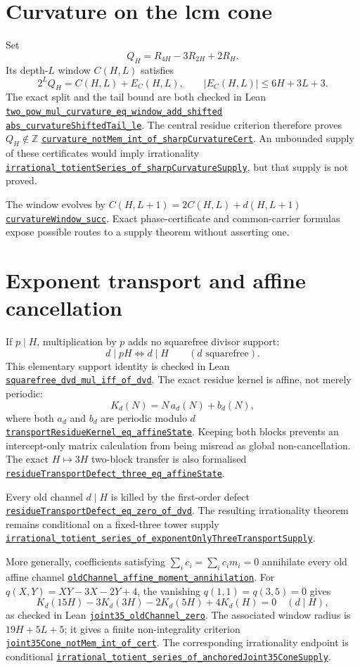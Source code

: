 \documentclass[11pt]{article}
\newcommand{\commit}{81150c1c6fdd4cd51e76d3aa0de344341e0e9e7c}
\newcommand{\repobase}{https://github.com/wcook04/plectis-lean-erdos249-257/blob/\commit}
\newcommand{\PK}{Erdos249257}
\newcommand{\lref}[3]{\href{\repobase/\PK/#1\#L#2}{\nolinkurl{#3}}}
\theoremstyle{remark}\newtheorem*{remark}{Remark}
\newcommand{\Z}{\mathbb Z}
\begin{document}
\section{Curvature on the lcm cone}\label{sec:curvature}
Set
\[
 Q_H=R_{4H}-3R_{2H}+2R_H.
\]
Its depth-$L$ window $C(H,L)$ satisfies
\[
 2^LQ_H=C(H,L)+E_C(H,L),\qquad |E_C(H,L)|\le6H+3L+3.
\]
The exact split and the tail bound are both checked in Lean
\lref{CurvatureCarry.lean}{119}{two_pow_mul_curvature_eq_window_add_shifted}
\lref{CurvatureCarry.lean}{137}{abs_curvatureShiftedTail_le}.
The central residue criterion therefore proves $Q_H\notin\Z$
\lref{CurvatureCarry.lean}{159}{curvature_notMem_int_of_sharpCurvatureCert}.
An unbounded supply of these certificates would imply irrationality
\lref{CurvatureCarry.lean}{206}{irrational_totientSeries_of_sharpCurvatureSupply},
but that supply is not proved.

The window evolves by
$C(H,L+1)=2C(H,L)+d(H,L+1)$
\lref{CurvatureCarry.lean}{259}{curvatureWindow_succ}. Exact phase-certificate
and common-carrier formulas expose possible routes to a supply theorem without
asserting one.

\section{Exponent transport and affine cancellation}\label{sec:transport}
If $p\mid H$, multiplication by $p$ adds no squarefree divisor support:
\[
 d\mid pH\Longleftrightarrow d\mid H\qquad(d\text{ squarefree}).
\]
This elementary support identity is checked in Lean
\lref{ExponentOnlyTransport.lean}{36}{squarefree_dvd_mul_iff_of_dvd}.
The exact residue kernel is affine, not merely periodic:
\[
 K_d(N)=N\,a_d(N)+b_d(N),
\]
where both $a_d$ and $b_d$ are periodic modulo $d$
\lref{ExponentOnlyTransport.lean}{141}{transportResidueKernel_eq_affineState}.
Keeping both blocks prevents an intercept-only matrix calculation from being
misread as global non-cancellation. The exact $H\mapsto3H$ two-block transfer
is also formalised
\lref{ExponentOnlyTransport.lean}{176}{residueTransportDefect_three_eq_affineState}.

Every old channel $d\mid H$ is killed by the first-order defect
\lref{ExponentOnlyTransport.lean}{112}{residueTransportDefect_eq_zero_of_dvd}.
The resulting irrationality theorem remains conditional on a fixed-three
tower supply
\lref{ExponentOnlyTransport.lean}{205}{irrational_totient_series_of_exponentOnlyThreeTransportSupply}.

More generally, coefficients satisfying $\sum_i c_i=\sum_i c_im_i=0$
annihilate every old affine channel
\lref{JointExponentTransport.lean}{36}{oldChannel_affine_moment_annihilation}.
For $q(X,Y)=XY-3X-2Y+4$, the vanishing $q(1,1)=q(3,5)=0$ gives
\[
 K_d(15H)-3K_d(3H)-2K_d(5H)+4K_d(H)=0\quad(d\mid H),
\]
as checked in Lean
\lref{JointExponentTransport.lean}{71}{joint35_oldChannel_zero}.
The associated window radius is $19H+5L+5$; it gives a finite
non-integrality criterion
\lref{JointExponentTransport.lean}{172}{joint35Cone_notMem_int_of_cert}.
The corresponding irrationality endpoint is conditional
\lref{JointExponentTransport.lean}{217}{irrational_totient_series_of_anchoredJoint35ConeSupply}.
\end{document}
